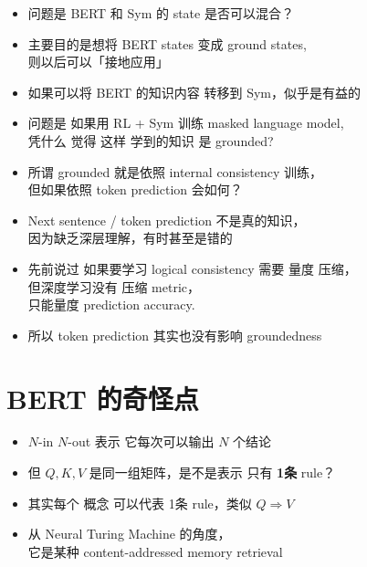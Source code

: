 \begin{itemize}
	\item 问题是 BERT 和 Sym 的 state 是否可以混合？
	\item 主要目的是想将 BERT states 变成 ground states,\\
		则以后可以「接地应用」
	\item 如果可以将 BERT 的知识内容 转移到 Sym，似乎是有益的
	\item 问题是 如果用 RL + Sym 训练 masked language model, \\
		凭什么 觉得 这样 学到的知识 是 grounded?
	\item 所谓 grounded 就是依照 internal consistency 训练，\\
		但如果依照 token prediction 会如何？
	\item Next sentence / token prediction 不是真的知识，\\
		因为缺乏深层理解，有时甚至是错的
	\item 先前说过 如果要学习 logical consistency 需要 量度 压缩，\\
		但深度学习没有 压缩 metric，\\
		只能量度 prediction accuracy.
	\item 所以 token prediction 其实也没有影响 groundedness
\end{itemize}

\section*{BERT 的奇怪点}

\begin{itemize}
	\item $N$-in $N$-out 表示 它每次可以输出 $N$ 个结论
	\item 但 $Q, K, V$ 是同一组矩阵，是不是表示 只有 \textbf{1条} rule？
	\item 其实每个 概念 可以代表 1条 rule，类似 $Q \Rightarrow V$
	\item 从 Neural Turing Machine 的角度，\\
		它是某种 content-addressed memory retrieval
\end{itemize}



